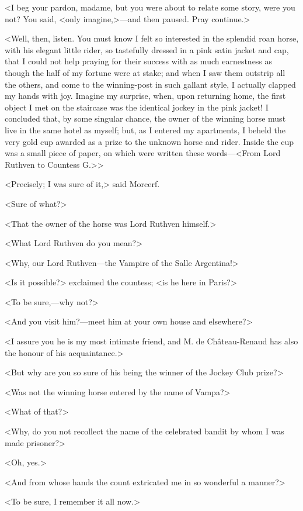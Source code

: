  <I beg your pardon, madame, but you were about to relate some story, were you not? You said, <only imagine,>—and then paused. Pray continue.> 

 <Well, then, listen. You must know I felt so interested in the splendid roan horse, with his elegant little rider, so tastefully dressed in a pink satin jacket and cap, that I could not help praying for their success with as much earnestness as though the half of my fortune were at stake; and when I saw them outstrip all the others, and come to the winning-post in such gallant style, I actually clapped my hands with joy. Imagine my surprise, when, upon returning home, the first object I met on the staircase was the identical jockey in the pink jacket! I concluded that, by some singular chance, the owner of the winning horse must live in the same hotel as myself; but, as I entered my apartments, I beheld the very gold cup awarded as a prize to the unknown horse and rider. Inside the cup was a small piece of paper, on which were written these words—<From Lord Ruthven to Countess G\doubleemdash.>> 

 <Precisely; I was sure of it,> said Morcerf. 

 <Sure of what?> 

 <That the owner of the horse was Lord Ruthven himself.> 

 <What Lord Ruthven do you mean?> 

 <Why, our Lord Ruthven—the Vampire of the Salle Argentina!> 

 <Is it possible?> exclaimed the countess; <is he here in Paris?> 

 <To be sure,—why not?> 

 <And you visit him?—meet him at your own house and elsewhere?> 

 <I assure you he is my most intimate friend, and M. de Château-Renaud has also the honour of his acquaintance.> 

 <But why are you so sure of his being the winner of the Jockey Club prize?> 

 <Was not the winning horse entered by the name of Vampa?> 

 <What of that?> 

 <Why, do you not recollect the name of the celebrated bandit by whom I was made prisoner?> 

 <Oh, yes.> 

 <And from whose hands the count extricated me in so wonderful a manner?> 

 <To be sure, I remember it all now.> 

